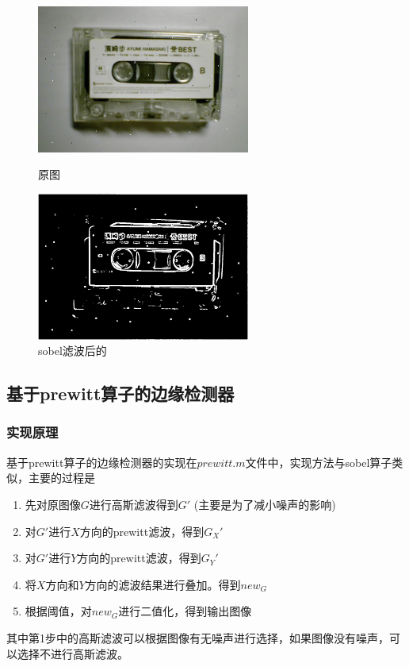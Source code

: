 \documentclass[11pt, a4paper, UTF8]{ctexart}
\begin{document}
\begin{figure}[H]
  \centering
  \begin{minipage}[t]{0.48\textwidth}
  \centering
  \includegraphics[width=7cm]{noise.jpg}
  \caption{原图}
  \end{minipage}
  \begin{minipage}[t]{0.48\textwidth}
  \centering
  \includegraphics[width=7cm]{sobel_all_noise.png}
  \caption{sobel滤波后的}
  \end{minipage}
\end{figure}



\subsection{基于prewitt算子的边缘检测器}

\subsubsection{实现原理}
基于prewitt算子的边缘检测器的实现在$prewitt.m$文件中，实现方法与sobel算子类似，主要的过程是
\begin{enumerate}
  \item 先对原图像$G$进行高斯滤波得到$G'$ (主要是为了减小噪声的影响)
  \item 对$G'$进行$X$方向的prewitt滤波，得到$G_X'$
  \item 对$G'$进行$Y$方向的prewitt滤波，得到$G_Y'$
  \item 将$X$方向和$Y$方向的滤波结果进行叠加。得到$new_G$
  \item 根据阈值，对$new_G$进行二值化，得到输出图像
\end{enumerate}
其中第1步中的高斯滤波可以根据图像有无噪声进行选择，如果图像没有噪声，可以选择不进行高斯滤波。
\end{document}
